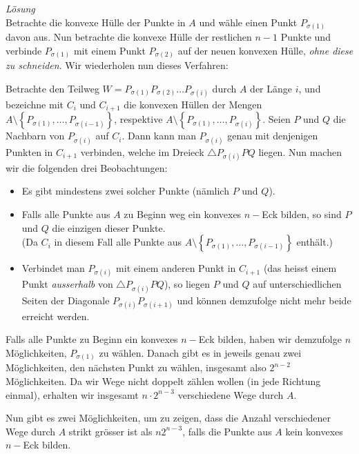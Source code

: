 \documentclass[12pt,a4paper]{article}
\theoremstyle{plain}
\theoremstyle{definition}
\theoremstyle{remark}
\begin{document}
\begin{enumerate}
\textit{Lösung}\\
Betrachte die konvexe Hülle der Punkte in $A$ und wähle einen Punkt $P_{\sigma(1)}$ davon aus. Nun betrachte die konvexe Hülle der restlichen $n-1$ Punkte und verbinde $P_{\sigma(1)}$ mit einem Punkt $P_{\sigma(2)}$ auf der neuen konvexen Hülle, \emph{ohne diese zu schneiden}. Wir wiederholen nun dieses Verfahren:

		Betrachte den Teilweg $W=P_{\sigma(1)} P_{\sigma(2)} \ldots P_{\sigma(i)}$ durch $A$ der Länge $i$, und bezeichne mit $C_i$ und $C_{i+1}$ die konvexen Hüllen der Mengen $A \setminus \left\{ P_{\sigma(1)}, \ldots, P_{\sigma(i-1)} \right\}$, respektive $A \setminus \left\{ P_{\sigma(1)}, \ldots, P_{\sigma(i)} \right\}$. Seien $P$ und $Q$ die Nachbarn von $P_{\sigma(i)}$ auf $C_i$. Dann kann man $P_{\sigma(i)}$ genau mit denjenigen Punkten in $C_{i+1}$ verbinden, welche im Dreieck $\triangle P_{\sigma(i)}PQ$ liegen. Nun machen wir die folgenden drei Beobachtungen:
		\begin{itemize}
			\item	Es gibt mindestens zwei solcher Punkte (nämlich $P$ und $Q$).
			\item	Falls alle Punkte aus $A$ zu Beginn weg ein konvexes $n-$Eck bilden, so sind $P$ und $Q$ die einzigen dieser Punkte.\\
				(Da $C_i$ in diesem Fall alle Punkte aus $A \setminus \left\{ P_{\sigma(1)}, \ldots, P_{\sigma(i-1)} \right\}$ enthält.) 
			\item	Verbindet man $P_{\sigma(i)}$ mit einem anderen Punkt in $C_{i+1}$ (das heisst einem Punkt \emph{ausserhalb} von $\triangle P_{\sigma(i)}PQ$), so liegen $P$ und $Q$ auf unterschiedlichen Seiten der Diagonale $P_{\sigma(i)}P_{\sigma(i+1)}$ und können demzufolge nicht mehr beide erreicht werden.
		\end{itemize}

		Falls alle Punkte zu Beginn ein konvexes $n-$Eck bilden, haben wir demzufolge $n$ Möglichkeiten, $P_{\sigma(1)}$ zu wählen. Danach gibt es in jeweils genau zwei Möglichkeiten, den nächsten Punkt zu wählen, insgesamt also $2^{n-2}$ Möglichkeiten. Da wir Wege nicht doppelt zählen wollen (in jede Richtung einmal), erhalten wir insgesamt $n\cdot 2^{n-3}$ verschiedene Wege durch $A$.

		Nun gibt es zwei Möglichkeiten, um zu zeigen, dass die Anzahl verschiedener Wege durch $A$ strikt grösser ist als $n2^{n-3}$, falls die Punkte aus $A$ kein konvexes $n-$Eck bilden.


\end{enumerate}
\end{document}
